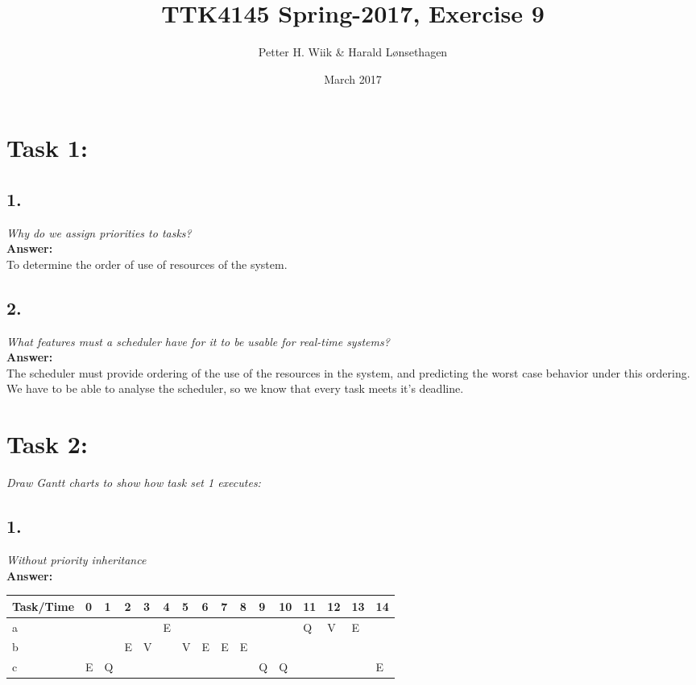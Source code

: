 \documentclass{article}
\title{TTK4145 Spring-2017, Exercise 9}
\author{Petter H. Wiik & Harald Lønsethagen}
\date{March 2017}
\begin{document}
\maketitle

\section*{Task 1:}
\subsection*{1.}
    \textit{Why do we assign priorities to tasks?}\\
\textbf{Answer:}\\
To determine the order of use of resources of the system.
    
\subsection*{2.}
    \textit{What features must a scheduler have for it to be usable for real-time systems?}\\
    \textbf{Answer:}\\
    The scheduler must provide ordering of the use of the resources in the system, and predicting the worst case behavior under this ordering. We have to be able to analyse the scheduler, so we know that every task meets it's deadline.
    
\section*{Task 2:}

\textit{Draw Gantt charts to show how task set 1 executes:}

\subsection*{1.}
    \textit{Without priority inheritance} \\
    \textbf{Answer:}\\
    
    \begin{table}[h!]
    \centering
    \begin{tabular}{|l|l|l|l|l|l|l|l|l|l|l|l|l|l|l|l|}
    \hline
    Task/Time & 0 & 1 & 2 & 3 & 4 & 5 & 6 & 7 & 8 & 9 & 10 & 11 & 12 & 13 & 14 \\ \hline
    a         &   &   &   &   & E &   &   &   &   &   &    & Q  & V  & E  &    \\ \hline
    b         &   &   & E & V &   & V & E & E & E &   &    &    &    &    &    \\ \hline
    c         & E & Q &   &   &   &   &   &   &   & Q & Q  &    &    &    & E  \\ \hline
    \end{tabular}
    \end{table}
        
\end{document}
